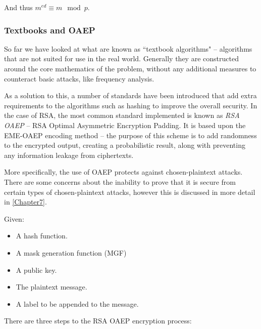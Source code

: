     And thus $m^{ed} \equiv m \mod p$.
    
    \subsubsection{Textbooks and OAEP}
    \label{subsubsec:oaep}
    
    So far we have looked at what are known as ``textbook algorithms" -- algorithms that are not suited for use in the real world. Generally they are constructed around the core mathematics of the problem, without any additional measures to counteract basic attacks, like frequency analysis. 
    
    As a solution to this, a number of standards have been introduced that add extra requirements to the algorithms such as hashing to improve the overall security. In the case of RSA, the most common standard implemented is known as \emph{RSA OAEP} -- RSA Optimal Asymmetric Encryption Padding\cite{Bellare:1995aa}. It is based upon the EME-OAEP encoding method -- the purpose of this scheme is to add randomness to the encrypted output, creating a probabilistic result, along with preventing any information leakage from ciphertexts.
    
    More specifically, the use of OAEP protects against chosen-plaintext attacks. There are some concerns about the inability to prove that it is secure from certain types of chosen-plaintext attacks, however this is discussed in more detail in \textsection\ref{Chapter7}.
    
    Given:
    
    \begin{itemize}
      \item A hash function.
      \item A mask generation function (MGF)
      \item A public key.
      \item The plaintext message.
      \item A label to be appended to the message.
    \end{itemize}
    
    There are three steps to the RSA OAEP encryption process:
    
